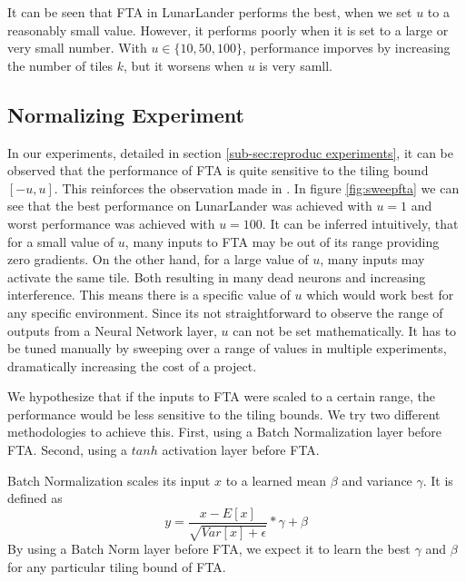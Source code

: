 \documentclass{article}
\begin{document}
It can be seen that FTA in LunarLander performs the best, when we set $u$ to a reasonably small value. However, it performs poorly when it is set to a large or very small number. With $u \in \{10, 50, 100\}$, performance imporves by increasing the number of tiles $k$, but it worsens when $u$ is very samll.



\subsection{Normalizing Experiment} \label{sub-sec:normalize experiments}
In our experiments, detailed in section \ref{sub-sec:reproduc experiments}, it can be observed that the performance of FTA is quite sensitive to the tiling bound $[-u, u]$. 
This reinforces the observation made in \cite{pan2019fuzzy}. 
In figure \ref{fig:sweepfta} we can see that the best performance on LunarLander was achieved with $u=1$ and worst performance was achieved with $u=100$.
It can be inferred intuitively, that for a small value of $u$, many inputs to FTA may be out of its range providing zero gradients. 
On the other hand, for a large value of $u$, many inputs may activate the same tile. 
Both resulting in many dead neurons and increasing interference. 
This means there is a specific value of $u$ which would work best for any specific environment. 
Since its not straightforward to observe the range of outputs from a Neural Network layer, $u$ can not be set mathematically. 
It has to be tuned manually by sweeping over a range of values in multiple experiments, dramatically increasing the cost of a project.

We hypothesize that if the inputs to FTA were scaled to a certain range, the performance would be less sensitive to the tiling bounds. 
We try two different methodologies to achieve this. 
First, using a Batch Normalization \cite[]{ioffe2015batch} layer before FTA. 
Second, using a $tanh$ activation layer before FTA. 

Batch Normalization scales its input $x$ to a learned mean $\beta$ and variance $\gamma$. 
It is defined as 
\begin{equation}
    y = \frac{x-E[x]}{\sqrt{Var[x] + \epsilon}} * \gamma + \beta
    \label{eq:batchnorm}
\end{equation}
By using a Batch Norm layer before FTA, we expect it to learn the best $\gamma$ and $\beta$ for any particular tiling bound of FTA.
\end{document}
